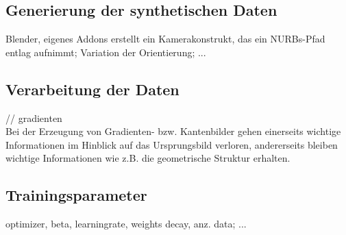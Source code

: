 \subsection{Generierung der synthetischen Daten}
Blender,
eigenes Addons erstellt ein Kamerakonstrukt, das ein NURBs-Pfad entlag aufnimmt; Variation der Orientierung; ...

\subsection{Verarbeitung der Daten}
// gradienten\\
Bei der Erzeugung von Gradienten- bzw. Kantenbilder gehen einerseits wichtige Informationen im Hinblick auf das Ursprungsbild verloren, andererseits bleiben wichtige Informationen wie z.B. die geometrische Struktur erhalten.

\subsection{Trainingsparameter}
optimizer, beta,
learningrate,
weights decay, anz. data; ...